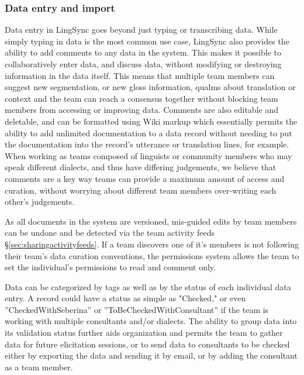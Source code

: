 \documentclass[letterpaper, 12pt, dvips]{mitwpl}
\begin{document}


\subsubsection{Data entry and import}


Data entry in LingSync goes beyond just typing or transcribing data. While simply typing in data is the most common use case, LingSync also provides the ability to add comments to any data in the system. This makes it possible to collaboratively enter data, and discuss data, without modifying or destroying information in the data itself. This means that multiple team members can suggest new segmentation, or new gloss information, qualms about translation or context and the team can reach a consensus together without blocking team members from accessing or improving data. Comments are also editable and deletable, and can be formatted using Wiki markup which essentially permits the ability to add unlimited documentation to a data record without needing to put the documentation into the record's utterance or translation lines, for example. When working as teams composed of linguists or community members who may speak different dialects, and thus have differing judgements, we believe that comments are a key way teams can provide a maximum amount of access and curation, without worrying about different team members over-writing each other's judgements. 

As all documents in the system are versioned, mis-guided edits by team members can be undone and be detected via the team activity feeds \S \ref{sec:sharingactivityfeeds}. If a team discovers one of it's members is not following their team's data curation conventions, the permissions system allows the team to set the individual's permissions to read and comment only.  

Data can be categorized by tags as well as by the status of each individual data entry. A record could have a status as simple as "Checked," or even ''CheckedWithSeberina'' or ''ToBeCheckedWithConsultant'' if the team is working with multiple consultants and/or dialects. The ability to group data into its validation status further aids organization and permits the team to gather data for future elicitation sessions, or to send data to consultants to be checked either by exporting the data and sending it by email, or by adding the consultant as a team member. 
\end{document}

